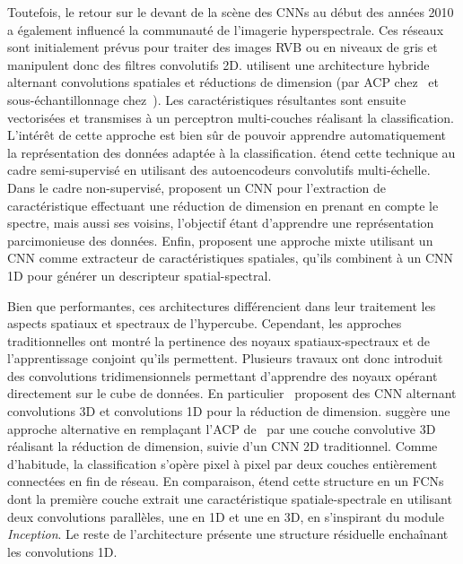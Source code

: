 Toutefois, le retour sur le devant de la scène des \glspl{CNN} au début des années 2010 a également influencé la communauté de l'imagerie hyperspectrale. Ces réseaux sont initialement prévus pour traiter des images \gls{RVB} ou en niveaux de gris et manipulent donc des filtres convolutifs 2D. \citet{makantasis_deep_2015,slavkovikj_hyperspectral_2015} utilisent une architecture hybride alternant convolutions spatiales et réductions de dimension (par \gls{ACP} chez~\citet{slavkovikj_hyperspectral_2015} et sous-échantillonnage chez~\citet{makantasis_deep_2015}). Les caractéristiques résultantes sont ensuite vectorisées et transmises à un perceptron multi-couches réalisant la classification. L'intérêt de cette approche est bien sûr de pouvoir apprendre automatiquement la représentation des données adaptée à la classification. \citet{zhao_combining_2015} étend cette technique au cadre semi-supervisé en utilisant des autoencodeurs convolutifs multi-échelle. Dans le cadre non-supervisé, \citet{romero_unsupervised_2015} proposent un \gls{CNN} pour l'extraction de caractéristique effectuant une réduction de dimension en prenant en compte le spectre, mais aussi ses voisins, l'objectif étant d'apprendre une représentation parcimonieuse des données. Enfin, \citet{zhao_spectral-spatial_2016,yue_spectral-spatial_2015} proposent une approche mixte utilisant un \gls{CNN} comme extracteur de caractéristiques spatiales, qu'ils combinent à un \gls{CNN} 1D pour générer un descripteur spatial-spectral.


Bien que performantes, ces architectures différencient dans leur traitement les aspects spatiaux et spectraux de l'hypercube. Cependant, les approches traditionnelles ont montré la pertinence des noyaux spatiaux-spectraux et de l'apprentissage conjoint qu'ils permettent. Plusieurs travaux ont donc introduit des convolutions tridimensionnels permettant d'apprendre des noyaux opérant directement sur le cube de données. En particulier~\citet{ben_hamida_deep_2016,chen_deep_2016} proposent des \gls{CNN} alternant convolutions 3D et convolutions 1D pour la réduction de dimension. \citet{luo_hsi-cnn_2018} suggère une approche alternative en remplaçant l'\gls{ACP} de~\citet{slavkovikj_hyperspectral_2015} par une couche convolutive 3D réalisant la réduction de dimension, suivie d'un \gls{CNN} 2D traditionnel. Comme d'habitude, la classification s'opère pixel à pixel par deux couches entièrement connectées en fin de réseau. En comparaison, \citet{lee_contextual_2016} étend cette structure en un \glspl{FCN} dont la première couche extrait une caractéristique spatiale-spectrale en utilisant deux convolutions parallèles, une en 1D et une en 3D, en s'inspirant du module \emph{Inception}. Le reste de l'architecture présente une structure résiduelle enchaînant les convolutions 1D.

